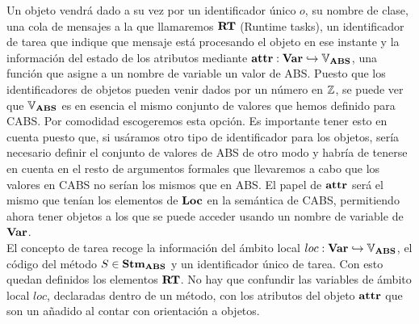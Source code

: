 Un objeto vendrá dado a su vez por un identificador único $o$, su nombre de clase, una cola de mensajes a la que llamaremos $\textbf{RT}$ (Runtime tasks), un identificador de tarea que indique que mensaje está procesando el objeto en ese instante y la información del estado de los atributos mediante $\textbf{attr}: \textbf{Var} \hookrightarrow \mathbb{V}_{\textbf{ABS}}$, una función que asigne a un nombre de variable un valor de ABS. Puesto que los identificadores de objetos pueden venir dados por un número en $\mathbb{Z}$, se puede ver que $\mathbb{V}_{\textbf{ABS}}$ es en esencia el mismo conjunto de valores que hemos definido para CABS. Por comodidad escogeremos esta opción. Es importante tener esto en cuenta puesto que, si usáramos otro tipo de identificador para los objetos, sería necesario definir el conjunto de valores de ABS de otro modo y habría de tenerse en cuenta en el resto de argumentos formales que llevaremos a cabo que los valores en CABS no serían los mismos que en ABS. El papel de $\textbf{attr}$ será el mismo que tenían los elementos de $\textbf{Loc}$ en la semántica de CABS, permitiendo ahora tener objetos a los que se puede acceder usando un nombre de variable de $\textbf{Var}$.\\

El concepto de tarea recoge la información del ámbito local $loc: \textbf{Var} \hookrightarrow \mathbb{V}_{\textbf{ABS}}$, el código del método $S \in \textbf{Stm}_{\textbf{ABS}}$ y un identificador único de tarea. Con esto quedan definidos los elementos $\textbf{RT}$. No hay que confundir las variables de ámbito local $loc$, declaradas dentro de un método, con los atributos del objeto $\textbf{attr}$ que son un añadido al contar con orientación a objetos.\\

